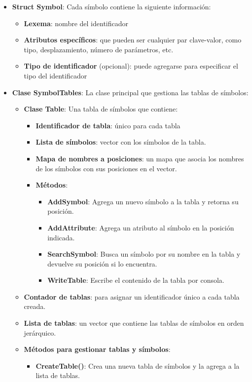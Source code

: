 \begin{itemize}
  \item \textbf{Struct Symbol}: Cada símbolo contiene la siguiente información:
  \begin{itemize}
    \item \textbf{Lexema}: nombre del identificador
    \item \textbf{Atributos específicos}: que pueden ser cualquier par clave-valor, como tipo, desplazamiento, número de parámetros, etc.
    \item \textbf{Tipo de identificador} (opcional): puede agregarse para especificar el tipo del identificador
  \end{itemize}

  \item \textbf{Clase SymbolTables}: La clase principal que gestiona las tablas de símbolos:
  \begin{itemize}
    \item \textbf{Clase Table}: Una tabla de símbolos que contiene:
        \begin{itemize}
            \item \textbf{Identificador de tabla}: único para cada tabla
            \item \textbf{Lista de símbolos}: vector con los símbolos de la tabla.
            \item \textbf{Mapa de nombres a posiciones}: un mapa que asocia los nombres de los símbolos con sus posiciones en el vector.
            \item \textbf{Métodos}: 
            \begin{itemize}
                \item \textbf{AddSymbol}: Agrega un nuevo símbolo a la tabla y retorna su posición.
                \item \textbf{AddAttribute}: Agrega un atributo al símbolo en la posición indicada.
                \item \textbf{SearchSymbol}: Busca un símbolo por su nombre en la tabla y devuelve su posición si lo encuentra.
                \item \textbf{WriteTable}: Escribe el contenido de la tabla por consola.
            \end{itemize}
        \end{itemize}
    \item \textbf{Contador de tablas}: para asignar un identificador único a cada tabla creada.
    \item \textbf{Lista de tablas}: un vector que contiene las tablas de símbolos en orden jerárquico.
    \item \textbf{Métodos para gestionar tablas y símbolos}: 
        \begin{itemize}          
            \item \textbf{CreateTable()}: Crea una nueva tabla de símbolos y la agrega a la lista de tablas. 
          

\end{itemize}
\end{itemize}
\end{itemize}
